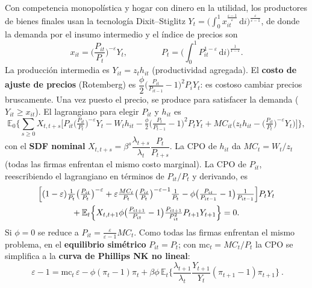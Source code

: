 \documentclass[11pt]{article}
\renewcommand{\boxed}[1]{#1}     %
\theoremstyle{definition}
\newcommand{\E}{\mathbb{E}}
\newcommand{\dd}{\,\mathrm{d}}
\newcommand{\mc}{\mathrm{mc}}
\begin{document}
Con competencia monopolística y hogar con dinero en la utilidad, los productores de bienes finales
usan la tecnología Dixit--Stiglitz
$Y_{t}=\big(\int_{0}^{1}x_{it}^{\frac{\varepsilon-1}{\varepsilon}}\dd i\big)^{\frac{\varepsilon}{\varepsilon-1}}$,
de donde la demanda por el insumo intermedio y el índice de precios son
\begin{equation}
x_{it}=\Big(\frac{P_{it}}{P_{t}}\Big)^{-\varepsilon}Y_{t},
\qquad\qquad
P_{t}=\Big(\int_{0}^{1}P_{it}^{1-\varepsilon}\dd i\Big)^{\frac{1}{1-\varepsilon}} .
\end{equation}
La producción intermedia es $Y_{it}=z_{t}h_{it}$ (productividad agregada). El \textbf{costo de ajuste
de precios} (Rotemberg) es $\dfrac{\phi}{2}\big(\tfrac{P_{it}}{P_{it-1}}-1\big)^{2}P_{i}Y_{t}$: es
costoso cambiar precios bruscamente. Una vez puesto el precio, se produce para satisfacer la demanda
($Y_{it}\ge x_{it}$). El lagrangiano para elegir $P_{it}$ y $h_{it}$ es
\begin{equation}
\E_{0}\Big\{\sum_{s\ge0}X_{t,t+s}\Big[P_{it}\Big(\tfrac{P_{it}}{P_{t}}\Big)^{-\varepsilon}Y_{t}
-W_{t}h_{it}-\tfrac{\phi}{2}\big(\tfrac{P_{t}}{P_{t-1}}-1\big)^{2}P_{t}Y_{t}
+MC_{it}\big(z_{t}h_{it}-\big(\tfrac{P_{it}}{P_{t}}\big)^{-\varepsilon}Y_{t}\big)\Big]\Big\},
\end{equation}
con el \textbf{SDF nominal} $X_{t,t+s}=\beta^{s}\dfrac{\lambda_{t+s}}{\lambda_{t}}\dfrac{P_{t}}{P_{t+s}}$.
La CPO de $h_{it}$ da $MC_{t}=W_{t}/z_{t}$ (todas las firmas enfrentan el mismo costo marginal). La CPO
de $P_{it}$, reescribiendo el lagrangiano en términos de $P_{it}/P_{t}$ y derivando, es
\begin{align}
&\Big[(1-\varepsilon)\tfrac{1}{P_{t}}\big(\tfrac{P_{it}}{P_{t}}\big)^{-\varepsilon}
+\varepsilon\tfrac{MC_{t}}{P_{t}}\big(\tfrac{P_{it}}{P_{t}}\big)^{-\varepsilon-1}\tfrac{1}{P_{t}}
-\phi\big(\tfrac{P_{it}}{P_{it-1}}-1\big)\tfrac{1}{P_{it-1}}\Big]P_{t}Y_{t} \notag\\
&\qquad\qquad
+\E_{t}\Big\{X_{t,t+1}\phi\big(\tfrac{P_{it+1}}{P_{it}}-1\big)\tfrac{P_{it+1}}{P_{it}^{2}}P_{t+1}Y_{t+1}\Big\}=0 .
\end{align}
Si $\phi=0$ se reduce a $P_{it}=\tfrac{\varepsilon}{\varepsilon-1}MC_{t}$. Como todas las firmas
enfrentan el mismo problema, en el \textbf{equilibrio simétrico} $P_{it}=P_{t}$; con $\mc_{t}=MC_{t}/P_{t}$
la CPO se simplifica a la \textbf{curva de Phillips NK no lineal}:
\begin{equation}
\boxed{\ \varepsilon-1=\mc_{t}\,\varepsilon-\phi(\pi_{t}-1)\pi_{t}
+\beta\phi\,\E_{t}\Big\{\frac{\lambda_{t+1}}{\lambda_{t}}\frac{Y_{t+1}}{Y_{t}}(\pi_{t+1}-1)\pi_{t+1}\Big\}\ }.
\end{equation}
\end{document}
